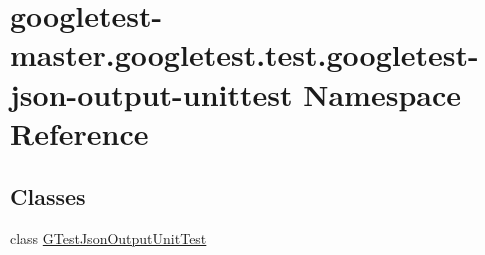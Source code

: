 \hypertarget{namespacegoogletest-master_1_1googletest_1_1test_1_1googletest-json-output-unittest}{}\section{googletest-\/master.googletest.\+test.\+googletest-\/json-\/output-\/unittest Namespace Reference}
\label{namespacegoogletest-master_1_1googletest_1_1test_1_1googletest-json-output-unittest}
\subsection*{Classes}
\begin{DoxyCompactItemize}
\item 
class \mbox{\hyperlink{classgoogletest-master_1_1googletest_1_1test_1_1googletest-json-output-unittest_1_1_g_test_json_output_unit_test}{G\+Test\+Json\+Output\+Unit\+Test}}
\end{DoxyCompactItemize}
